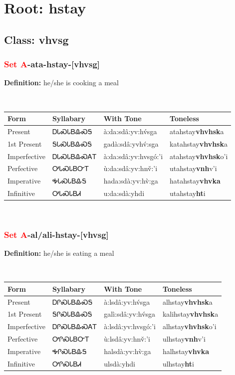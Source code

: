 \needspace{4in}
\section*{Root: hstay}
\nopagebreak
{}
\needspace{3in}
\subsection*{Class: vhvsg}
\nopagebreak
\needspace{2in}
\subsubsection*{\textcolor{Red}{Set A}{-}ata{-}\textbf{hstay}{-}[vhvsg]}
\nopagebreak
\textbf{Definition: } he/she is cooking a meal
\\[0.5em]
\begin{tabularx}{\textwidth}{l X X X}%
\toprule%
\textbf{Form}&\textbf{Syllabary}&\textbf{With Tone}&\textbf{Toneless}\\%
\midrule%
Present&ᎠᏓᏍᏓᏴᎲᏍᎦ&à:da:sdâ:yv:hv́sga&atahstay\textbf{vhvhsk}a\\%
1st Present&ᎦᏓᏍᏓᏴᎲᏍᎦ&gadà:sdâ:yvhv́:sga&katahstay\textbf{vhvhsk}a\\%
Imperfective&ᎠᏓᏍᏓᏴᎲᏍᎪᎢ&à:da:sdâ:yv:hvsgó:’i&atahstay\textbf{vhvhsk}o'i\\%
Perfective&ᎤᏓᏍᏓᏴᏅᎢ&ù:da:sdâ:yv:hnv̌:’i&utahstay\textbf{vnh}v'i\\%
Imperative&ᎭᏓᏍᏓᏴᎲᎦ&hada:sdà:yv:hv̀:ga&hatahstay\textbf{vhvka}\\%
Infinitive&ᎤᏓᏍᏓᏴᏗ&u:da:sdà:yhdi&utahstay\textbf{ht}i\\%
\bottomrule%
\end{tabularx}
\\[1em]
\needspace{2in}
\subsubsection*{\textcolor{Red}{Set A}{-}al/ali{-}\textbf{hstay}{-}[vhvsg]}
\nopagebreak
\textbf{Definition: } he/she is eating a meal
\\[0.5em]
\begin{tabularx}{\textwidth}{l X X X}%
\toprule%
\textbf{Form}&\textbf{Syllabary}&\textbf{With Tone}&\textbf{Toneless}\\%
\midrule%
Present&ᎠᎵᏍᏓᏴᎲᏍᎦ&à:lsdâ:yv:hv́sga&alhstay\textbf{vhvhsk}a\\%
1st Present&ᎦᎵᏍᏓᏴᎲᏍᎦ&galì:sdâ:yv:hv́sga&kalihstay\textbf{vhvhsk}a\\%
Imperfective&ᎠᎵᏍᏓᏴᎲᏍᎪᎢ&à:lsdâ:yv:hvsgó:’i&alhstay\textbf{vhvhsk}o'i\\%
Perfective&ᎤᎵᏍᏓᏴᏅᎢ&ù:lsdâ:yv:hnv̌:’i&ulhstay\textbf{vnh}v'i\\%
Imperative&ᎭᎵᏍᏓᏴᎲᎦ&halsdà:yv:hv̀:ga&halhstay\textbf{vhvka}\\%
Infinitive&ᎤᎵᏍᏓᏴᏗ&ulsdà:yhdi&ulhstay\textbf{ht}i\\%
\bottomrule%
\end{tabularx}
\\[1em]